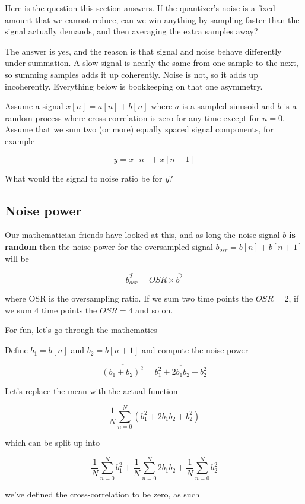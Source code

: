 Here is the question this section answers. If the quantizer's noise is a
fixed amount that we cannot reduce, can we win anything by sampling
faster than the signal actually demands, and then averaging the extra
samples away?

The answer is yes, and the reason is that signal and noise behave
differently under summation. A slow signal is nearly the same from one
sample to the next, so summing samples adds it up coherently. Noise is
not, so it adds up incoherently. Everything below is bookkeeping on that
one asymmetry.

Assume a signal \(x[n] = a[n] + b[n]\) where \(a\) is a sampled sinusoid
and \(b\) is a random process where cross-correlation is zero for any
time except for \(n=0\). Assume that we sum two (or more) equally spaced
signal components, for example

\[y = x[n] + x[n+1]\]

What would the signal to noise ratio be for \(y\)?

\subsection{Noise power}\label{noise-power}

Our mathematician friends have looked at this, and as long the noise
signal \(b\) \textbf{is random} then the noise power for the oversampled
signal \(b_{osr} = b[n] + b[n+1]\) will be

\[ \overline{b_{osr}^2} = OSR \times \overline{b^2} \]

where OSR is the oversampling ratio. If we sum two time points the
\(OSR=2\), if we sum 4 time points the \(OSR=4\) and so on.

For fun, let's go through the mathematics

Define \(b_1 = b[n]\) and \(b_2 = b[n+1]\) and compute the noise power

\[
\overline{(b_1 + b_2)^2} = \overline{b_1^2 + 2b_1b_2 + b_2^2}
\]

Let's replace the mean with the actual function

\[
\frac{1}{N}\sum_{n=0}^N{\left(b_1^2 + 2b_1b_2 + b_2^2\right)}
\]

which can be split up into

\[
\frac{1}{N}\sum_{n=0}^N{b_1^2} + \frac{1}{N}\sum_{n=0}^N{2b_1b_2} + \frac{1}{N}\sum_{n=0}^N{b_2^2}
\]

we've defined the cross-correlation to be zero, as such

